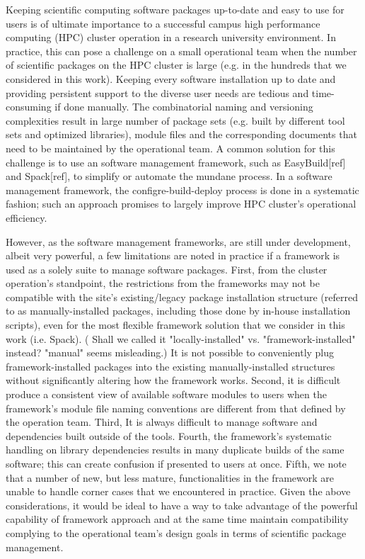 \documentclass[conference]{IEEEtran}
\begin{document}
Keeping scientific computing software packages up-to-date and easy to use for users is of ultimate importance to a successful campus high performance computing (HPC) cluster operation in a research university environment.
In practice, this can pose a challenge on a small operational team
when the number of scientific packages on the HPC cluster is large (e.g. in the hundreds that we considered in this work). Keeping every software installation up to date and providing persistent support to the diverse user needs are tedious and time-consuming if done manually.
The combinatorial naming and versioning complexities result in large number of package sets (e.g. built by different tool sets and optimized libraries), module files and the corresponding documents that need to be maintained by the operational team. 
A common solution for this challenge is to use an software management framework, such as EasyBuild[ref] and Spack[ref], to simplify or automate the mundane process. In a software management framework, the configre-build-deploy process is done in a systematic fashion; such an approach promises to largely improve HPC cluster's operational efficiency. 

However, as the software management frameworks, are still under development, albeit very powerful, a few limitations are noted in practice if a framework is used as a solely suite to manage software packages.
First, from the cluster operation's standpoint, the restrictions from the frameworks may not be compatible with the site's existing/legacy package installation structure (referred to as manually-installed packages, including those done by in-house installation scripts), even for the most flexible framework solution that we consider in this work (i.e. Spack). ({\color{red} Shall we called it "locally-installed" vs. "framework-installed" instead? "manual" seems misleading.}) It is not possible to conveniently plug framework-installed packages into the existing manually-installed structures without significantly altering how the framework works. 
Second, it is difficult produce a consistent view of available software modules to users when the framework's module file naming conventions are different from that defined by the operation team. 
Third, It is always difficult to manage software and dependencies built outside of the tools. 
Fourth, the framework's systematic handling on library dependencies results in many duplicate builds of the same software; this can create confusion if presented to users at once.
Fifth, we note that a number of new, but less mature, functionalities in the framework are unable to handle corner cases that we encountered in practice. Given the above considerations, it would be ideal to have a way to take advantage of the powerful capability of framework approach and at the same time maintain compatibility complying to the operational team's design goals in terms of scientific package management.
\end{document}
